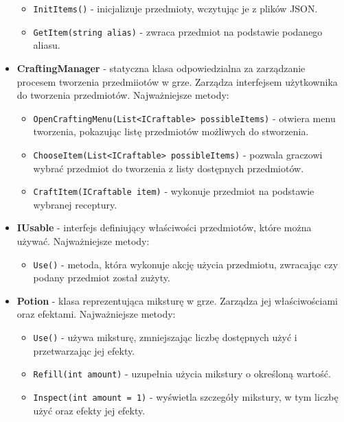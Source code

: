 \begin{itemize}
            \begin{itemize}
                \item \texttt{InitItems()} - inicjalizuje przedmioty, wczytując je z plików JSON.
                \item \texttt{GetItem(string alias)} - zwraca przedmiot na podstawie podanego aliasu.
            \end{itemize}
        \item \textbf{CraftingManager} - statyczna klasa odpowiedzialna za zarządzanie procesem tworzenia przedmiiotów w grze. 
        Zarządza interfejsem użytkownika do tworzenia przedmiotów. Najważniejsze metody:
            \begin{itemize}
                \item \texttt{OpenCraftingMenu(List<ICraftable> possibleItems)} - otwiera menu tworzenia, pokazując listę przedmiotów możliwych do stworzenia.
                \item \texttt{ChooseItem(List<ICraftable> possibleItems)} - pozwala graczowi wybrać przedmiot do tworzenia z listy dostępnych przedmiotów.
                \item \texttt{CraftItem(ICraftable item)} - wykonuje przedmiot na podstawie wybranej receptury.
            \end{itemize}
        \item \textbf{IUsable} - interfejs definiujący właściwości przedmiotów, które można używać. Najważniejsze metody:
            \begin{itemize}
                \item \texttt{Use()} - metoda, która wykonuje akcję użycia przedmiotu, zwracając czy podany przedmiot został zużyty.
            \end{itemize}
        \item \textbf{Potion} - klasa reprezentująca miksturę w grze. 
        Zarządza jej właściwościami oraz efektami. Najważniejsze metody:
            \begin{itemize}
                \item \texttt{Use()} - używa miksturę, zmniejszając liczbę dostępnych użyć i przetwarzając jej efekty.
                \item \texttt{Refill(int amount)} - uzupełnia użycia mikstury o określoną wartość.
                \item \texttt{Inspect(int amount = 1)} - wyświetla szczegóły mikstury, w tym liczbę użyć oraz efekty jej efekty.
            \end{itemize}

\end{itemize}
